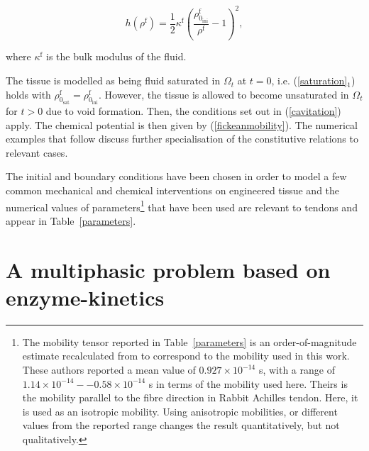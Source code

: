\begin{equation}
h(\rho^\mathrm{f}) =
\frac{1}{2}\kappa^\mathrm{f}\left(
\frac{\rho_{0_\mathrm{ini}}^\mathrm{f}}{\rho^\mathrm{f}}
- 1\right)^2,
\end{equation}

\noindent where $\kappa^\mathrm{f}$ is the bulk modulus of the fluid.

The tissue is modelled as being fluid saturated in $\Omega_t$ at $t =
0$, i.e. (\ref{saturation}$_1$) holds with
$\rho^\mathrm{f}_{0_\mathrm{sat}} =
\rho^\mathrm{f}_{0_\mathrm{ini}}$. However, the tissue is allowed to
become unsaturated in $\Omega_t$ for $t > 0$ due to void
formation. Then, the conditions set out in (\ref{cavitation})
apply. The chemical potential is then given by
(\ref{fickeanmobility}). The numerical examples that follow discuss
further specialisation of the constitutive relations to relevant
cases.

The initial and boundary conditions have been chosen in order to model
a few common mechanical and chemical interventions on engineered
tissue and the numerical values of parameters\footnote{The mobility
  tensor reported in Table~\ref{parameters} is an order-of-magnitude
  estimate recalculated from \citet{Hanetal:2000} to correspond to the
  mobility used in this work. These authors reported a mean value of
  $0.927\times 10^{-14}$ s, with a range of $1.14\times
  10^{-14}--0.58\times 10^{-14}$ s in terms of the mobility used
  here. Theirs is the mobility parallel to the fibre direction in
  Rabbit Achilles tendon. Here, it is used as an isotropic
  mobility. Using anisotropic mobilities, or different values from the
  reported range changes the result quantitatively, but not
  qualitatively.} that have been used are relevant to tendons and
appear in Table~\ref{parameters}.

\section{A multiphasic problem based on enzyme-kinetics}
\label{enzyme-kinetics-example}


